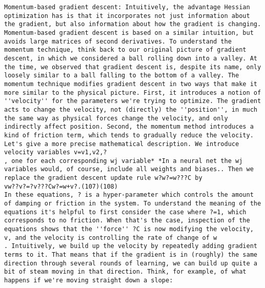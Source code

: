 \begin{lstlisting}
Momentum-based gradient descent: Intuitively, the advantage Hessian optimization has is that it incorporates not just information about the gradient, but also information about how the gradient is changing. Momentum-based gradient descent is based on a similar intuition, but avoids large matrices of second derivatives. To understand the momentum technique, think back to our original picture of gradient descent, in which we considered a ball rolling down into a valley. At the time, we observed that gradient descent is, despite its name, only loosely similar to a ball falling to the bottom of a valley. The momentum technique modifies gradient descent in two ways that make it more similar to the physical picture. First, it introduces a notion of ''velocity'' for the parameters we're trying to optimize. The gradient acts to change the velocity, not (directly) the ''position'', in much the same way as physical forces change the velocity, and only indirectly affect position. Second, the momentum method introduces a kind of friction term, which tends to gradually reduce the velocity.
Let's give a more precise mathematical description. We introduce velocity variables v=v1,v2,?
, one for each corresponding wj variable* *In a neural net the wj variables would, of course, include all weights and biases.. Then we replace the gradient descent update rule w?w?=w???C by 
vw??v?=?v???Cw?=w+v?.(107)(108)
In these equations, ? is a hyper-parameter which controls the amount of damping or friction in the system. To understand the meaning of the equations it's helpful to first consider the case where ?=1, which corresponds to no friction. When that's the case, inspection of the equations shows that the ''force'' ?C is now modifying the velocity, v, and the velocity is controlling the rate of change of w
. Intuitively, we build up the velocity by repeatedly adding gradient terms to it. That means that if the gradient is in (roughly) the same direction through several rounds of learning, we can build up quite a bit of steam moving in that direction. Think, for example, of what happens if we're moving straight down a slope:


\end{lstlisting}
